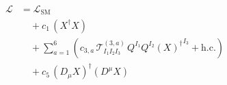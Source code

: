 \documentclass{article}
\begin{document}
\begin{align*}\mathcal{L} &= \mathcal{L}_{\mathrm{SM}}\\ &\quad + c_{1}\,\left(X^{\dagger} X\right)\\ &\quad + \sum_{a=1}^{6} \left(c_{3,a}\,\mathcal{T}^{(3,a)}_{I_{1} I_{2} I_{3}}\,{Q}^{I_{1}} {Q}^{I_{2}} {(X)^{\dagger}}^{I_{3}} + \mathrm{h.c.}\right)\\ &\quad + c_{5}\,\left(D_{\mu} X\right)^{\dagger}\left(D^{\mu} X\right)\end{align*}
\end{document}

